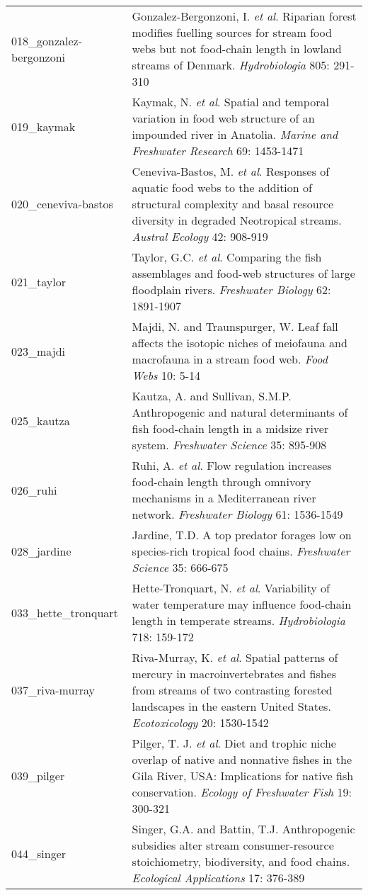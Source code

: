 \begin{longtable}{p{}p{}}
  018_gonzalez-bergonzoni & Gonzalez-Bergonzoni, I. \textit{et al}. Riparian forest modifies fuelling sources for stream food webs but not food-chain length in lowland streams of Denmark. \textit{Hydrobiologia} 805: 291-310 \\ 
  019_kaymak & Kaymak, N. \textit{et al}. Spatial and temporal variation in food web structure of an impounded river in Anatolia. \textit{Marine and Freshwater Research} 69: 1453-1471 \\ 
  020_ceneviva-bastos & Ceneviva-Bastos, M. \textit{et al}. Responses of aquatic food webs to the addition of structural complexity and basal resource diversity in degraded Neotropical streams. \textit{Austral Ecology} 42: 908-919 \\ 
  021_taylor & Taylor, G.C. \textit{et al}. Comparing the fish assemblages and food-web structures of large floodplain rivers. \textit{Freshwater Biology} 62: 1891-1907 \\ 
  023_majdi & Majdi, N. and Traunspurger, W. Leaf fall affects the isotopic niches of meiofauna and macrofauna in a stream food web. \textit{Food Webs} 10: 5-14 \\ 
  025_kautza & Kautza, A. and Sullivan, S.M.P. Anthropogenic and natural determinants of fish food-chain length in a midsize river system. \textit{Freshwater Science} 35: 895-908 \\ 
  026_ruhi & Ruhi, A. \textit{et al}. Flow regulation increases food-chain length through omnivory mechanisms in a Mediterranean river network. \textit{Freshwater Biology} 61: 1536-1549 \\ 
  028_jardine & Jardine, T.D. A top predator forages low on species-rich tropical food chains. \textit{Freshwater Science} 35: 666-675 \\ 
  033_hette_tronquart & Hette-Tronquart, N. \textit{et al}. Variability of water temperature may influence food-chain length in temperate streams. \textit{Hydrobiologia} 718: 159-172 \\ 
  037_riva-murray & Riva-Murray, K. \textit{et al}. Spatial patterns of mercury in macroinvertebrates and fishes from streams of two contrasting forested landscapes in the eastern United States. \textit{Ecotoxicology} 20: 1530-1542 \\ 
  039_pilger & Pilger, T. J. \textit{et al}. Diet and trophic niche overlap of native and nonnative fishes in the Gila River, USA: Implications for native fish conservation. \textit{Ecology of Freshwater Fish} 19: 300-321 \\ 
  044_singer & Singer, G.A. and Battin, T.J. Anthropogenic subsidies alter stream consumer-resource stoichiometry, biodiversity, and food chains. \textit{Ecological Applications} 17: 376-389 \\ 

\end{longtable}
